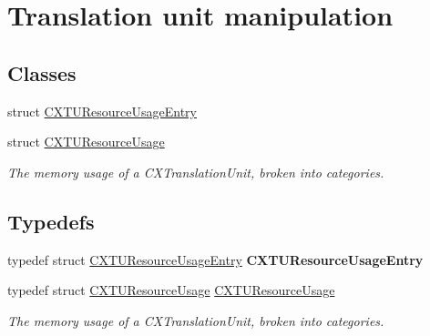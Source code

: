 \hypertarget{group__CINDEX__TRANSLATION__UNIT}{}\section{Translation unit manipulation}
\label{group__CINDEX__TRANSLATION__UNIT}
\subsection*{Classes}
\begin{DoxyCompactItemize}
\item 
struct \mbox{\hyperlink{structCXTUResourceUsageEntry}{C\+X\+T\+U\+Resource\+Usage\+Entry}}
\item 
struct \mbox{\hyperlink{structCXTUResourceUsage}{C\+X\+T\+U\+Resource\+Usage}}
\begin{DoxyCompactList}\small\item\em The memory usage of a C\+X\+Translation\+Unit, broken into categories. \end{DoxyCompactList}\end{DoxyCompactItemize}
\subsection*{Typedefs}
\begin{DoxyCompactItemize}
\item 
\mbox{\label{group__CINDEX__TRANSLATION__UNIT_ga32223514671dc2bd33d209f0b0151383}} 
typedef struct \mbox{\hyperlink{structCXTUResourceUsageEntry}{C\+X\+T\+U\+Resource\+Usage\+Entry}} {\bfseries C\+X\+T\+U\+Resource\+Usage\+Entry}
\item 
\mbox{\label{group__CINDEX__TRANSLATION__UNIT_gae738c4f5e575afa14cc080ca27050ba6}} 
typedef struct \mbox{\hyperlink{structCXTUResourceUsage}{C\+X\+T\+U\+Resource\+Usage}} \mbox{\hyperlink{group__CINDEX__TRANSLATION__UNIT_gae738c4f5e575afa14cc080ca27050ba6}{C\+X\+T\+U\+Resource\+Usage}}
\begin{DoxyCompactList}\small\item\em The memory usage of a C\+X\+Translation\+Unit, broken into categories. \end{DoxyCompactList}\end{DoxyCompactItemize}
